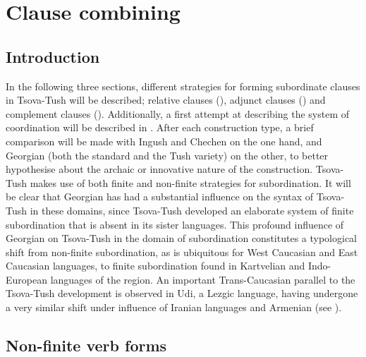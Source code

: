 \chapter{Clause combining} \label{subordination}

\section{Introduction}


In the following three sections, different strategies for forming subordinate clauses in Tsova-Tush will be described; relative clauses (), adjunct clauses () and complement clauses (). Additionally, a first attempt at describing the system of coordination will be described in . After each construction type, a brief comparison will be made with Ingush and Chechen on the one hand, and Georgian (both the standard and the Tush variety) on the other, to better hypothesise about the archaic or innovative nature of the construction. Tsova-Tush makes use of both finite and non-finite strategies for subordination. It will be clear that Georgian has had a substantial influence on the syntax of Tsova-Tush in these domains, since Tsova-Tush developed an elaborate system of finite subordination that is absent in its sister languages. This profound influence of Georgian on Tsova-Tush in the domain of subordination constitutes a typological shift from non-finite subordination, as is ubiquitous for West Caucasian and East Caucasian languages, to finite subordination found in Kartvelian and Indo-European languages of the region. An important Trans-Caucasian parallel to the Tsova-Tush development is observed in Udi, a Lezgic language, having undergone a very similar shift under influence of Iranian languages and Armenian (see \cite{gippert2011udirelative,gippertschulze2023caucalbanian,schulzegippert2023caucalbanianudi}).

\section{Non-finite verb forms} \label{nonfinite}

